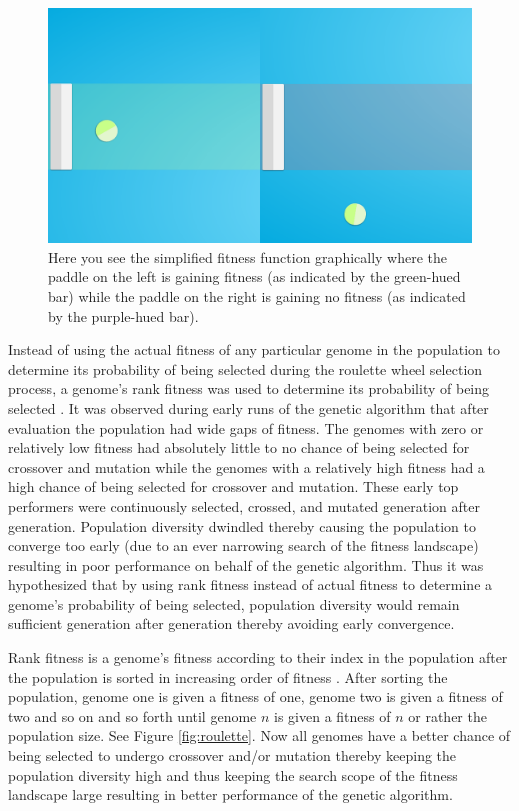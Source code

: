 \documentclass[a4paper,10pt]{article}
\begin{document}
\begin{figure}[H]  
  \centering
  \includegraphics[width=.45\textwidth]{figures/simple_fit_func.png}
  \caption{Here you see the simplified fitness function graphically where the paddle on the left is gaining fitness (as indicated by the green-hued bar) while the paddle on the right is gaining no fitness (as indicated by the purple-hued bar).}
  \label{fig:simple_fit_func}
\end{figure}

Instead of using the actual fitness of any particular genome in the population to determine its probability of being selected during the roulette wheel selection process, a genome's rank fitness was used to determine its probability of being selected \cite{geneticalgorithm}. It was observed during early runs of the genetic algorithm that after evaluation the population had wide gaps of fitness. The genomes with zero or relatively low fitness had absolutely little to no chance of being selected for crossover and mutation while the genomes with a relatively high fitness had a high chance of being selected for crossover and mutation. These early top performers were continuously selected, crossed, and mutated generation after generation. Population diversity dwindled thereby causing the population to converge too early (due to an ever narrowing search of the fitness landscape) resulting in poor performance on behalf of the genetic algorithm. Thus it was hypothesized that by using rank fitness instead of actual fitness to determine a genome's probability of being selected, population diversity would remain sufficient generation after generation thereby avoiding early convergence. 

Rank fitness is a genome's fitness according to their index in the population after the population is sorted in increasing order of fitness \cite{genselect}. After sorting the population, genome one is given a fitness of one, genome two is given a fitness of two and so on and so forth until genome $n$ is given a fitness of $n$ or rather the population size. See Figure \ref{fig:roulette}. Now all genomes have a better chance of being selected to undergo crossover and/or mutation thereby keeping the population diversity high and thus keeping the search scope of the fitness landscape large resulting in better performance of the genetic algorithm.   
\end{document}
